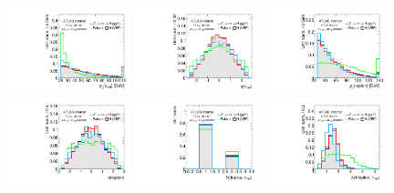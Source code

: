 \clearpage
\begin{figure}[tp]
  \centering
  \includegraphics[width=0.32\textwidth]{figures/overlaid/boost/tau-pt}
  \includegraphics[width=0.32\textwidth]{figures/overlaid/boost/tau-eta}
  \includegraphics[width=0.32\textwidth]{figures/overlaid/boost/lep-pt-hi} \\
  \includegraphics[width=0.32\textwidth]{figures/overlaid/boost/lep-eta} 
  \includegraphics[width=0.32\textwidth]{figures/overlaid/boost/tau-numTrack}
  \includegraphics[width=0.32\textwidth]{figures/overlaid/boost/taulep-dR} \\

\end{figure}
